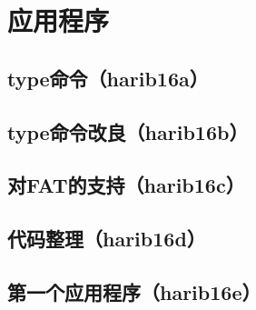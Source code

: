 ﻿\chapter{	应用程序	}
\section{	type命令（harib16a）	}
\section{	type命令改良（harib16b）	}
\section{	对FAT的支持（harib16c）	}
\section{	代码整理（harib16d）	}
\section{	第一个应用程序（harib16e）	}

